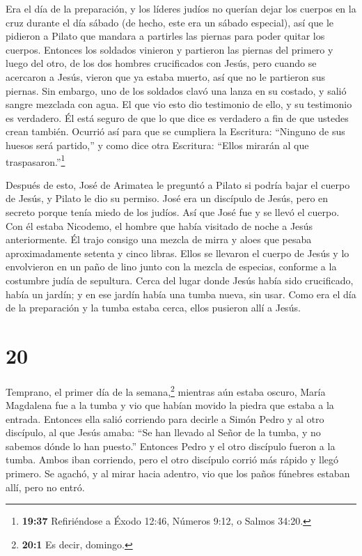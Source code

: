  Era el día de la preparación, y los líderes judíos no
querían dejar los cuerpos en la cruz durante el día sábado (de hecho,
este era un sábado especial), así que le pidieron a Pilato que mandara a
partirles las piernas para poder quitar los cuerpos. 
Entonces los soldados vinieron y partieron las piernas del primero y
luego del otro, de los dos hombres crucificados con Jesús, 
pero cuando se acercaron a Jesús, vieron que ya estaba muerto, así que
no le partieron sus piernas.  Sin embargo, uno de los
soldados clavó una lanza en su costado, y salió sangre mezclada con
agua.  El que vio esto dio testimonio de ello, y su
testimonio es verdadero. Él está seguro de que lo que dice es verdadero
a fin de que ustedes crean también.  Ocurrió así para que
se cumpliera la Escritura: ``Ninguno de sus huesos será partido,''
 y como dice otra Escritura: ``Ellos mirarán al que
traspasaron.''\footnote{\textbf{19:37} Refiriéndose a Éxodo 12:46,
  Números 9:12, o Salmos 34:20.}

 Después de esto, José de Arimatea le preguntó a Pilato si
podría bajar el cuerpo de Jesús, y Pilato le dio su permiso. José era un
discípulo de Jesús, pero en secreto porque tenía miedo de los judíos.
Así que José fue y se llevó el cuerpo.  Con él estaba
Nicodemo, el hombre que había visitado de noche a Jesús anteriormente.
Él trajo consigo una mezcla de mirra y aloes que pesaba aproximadamente
setenta y cinco libras.  Ellos se llevaron el cuerpo de
Jesús y lo envolvieron en un paño de lino junto con la mezcla de
especias, conforme a la costumbre judía de sepultura. Cerca del lugar
donde Jesús había sido crucificado, había un jardín;  y en
ese jardín había una tumba nueva, sin usar.  Como era el
día de la preparación y la tumba estaba cerca, ellos pusieron allí a
Jesús.

\hypertarget{section-19}{%
\section{20}\label{section-19}}

 Temprano, el primer día de la semana,\footnote{\textbf{20:1}
  Es decir, domingo.} mientras aún estaba oscuro, María Magdalena fue a
la tumba y vio que habían movido la piedra que estaba a la entrada.
 Entonces ella salió corriendo para decirle a Simón Pedro y
al otro discípulo, al que Jesús amaba: ``Se han llevado al Señor de la
tumba, y no sabemos dónde lo han puesto.''  Entonces Pedro y
el otro discípulo fueron a la tumba.  Ambos iban corriendo,
pero el otro discípulo corrió más rápido y llegó primero. 
Se agachó, y al mirar hacia adentro, vio que los paños fúnebres estaban
allí, pero no entró.

